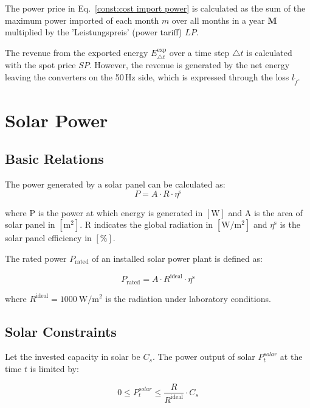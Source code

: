 \noindent The power price in Eq.~\eqref{const:cost import power} is calculated as the sum of the maximum power imported of each month $m$ over all months in a year $\textbf{M}$ multiplied by the 'Leistungspreis' (power tariff) $LP$.

\noindent The revenue from the exported energy $E^{\text{exp}}_{\triangle t}$ over a time step $\triangle t$ is calculated with the spot price $SP$. However, the revenue is generated by the net energy leaving the converters on the 50\,Hz side, which is expressed through the loss $l_{\tilde{f}}$.
 
\section{Solar Power}
\subsection{Basic Relations}
The power generated by a solar panel can be calculated as:
\begin{equation}
    P = A \cdot R \cdot \eta^\text{s}
\end{equation}

\noindent where P is the power at which energy is generated in $[\si{\W}]$ and A is the area of solar panel in $[\si{\square\metre}]$. R indicates the global radiation in $[\si{\W\per\square\metre}]$ and
$\eta^{\text{s}}$ is the solar panel efficiency in $[\%]$.

The rated power $P_\text{rated}$ of an installed solar power plant is defined as: 

\begin{equation}
    P_\text{rated} = A \cdot R^\text{ideal} \cdot \eta^\text{s}
\end{equation}

\noindent where $R^\text{ideal} = \SI{1000}{\W\per\square\metre}$ is the radiation under laboratory conditions.

\subsection{Solar Constraints}
Let the invested capacity in solar be $C_s$. The power output of solar $P^{solar}_{t}$ at the time $t$ is limited by:

\setlength{\belowdisplayskip}{0pt} 
\setlength{\abovedisplayskip}{0pt} 

\begin{equation}\label{const:solar}
    0 \leq P^{solar}_{t} \leq \frac{R}{R^\text{ideal}} \cdot C_s
\end{equation}

